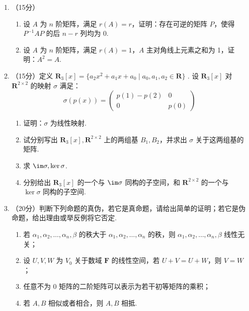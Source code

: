 \begin{enumerate}
    \item （15分）
    \begin{enumerate}
        \item 设 $A$ 为 $n$ 阶矩阵，满足 $r(A)=r$，证明：存在可逆的矩阵 $P$，使得 $P^{-1}AP$ 的后 $n-r$ 列均为 0.
        \item 设 $A$ 为 $n$ 阶矩阵，满足 $r(A)=1$，$A$ 主对角线上元素之和为 1，证明：$A^2=A$.
    \end{enumerate}

    \item （15分）定义 $\mathbf R_3[x]=\{a_2x^2+a_1x+a_0\mid a_0,a_1,a_2\in \mathbf R\}$ . 设 $\mathbf R_3[x]$ 对 $\mathbf R^{2\times 2}$ 的映射 $\sigma$ 满足：
    \[\sigma(p(x))=\begin{pmatrix}
    p(1)-p(2)&0\\
    0 & p(0)\end{pmatrix}\]

    \begin{enumerate}
        \item 证明：$\sigma$ 为线性映射.
        \item 试分别写出 $\mathbf R_3[x],\mathbf R^{2\times 2}$ 上的两组基 $B_1,B_2$，并求出 $\sigma$ 关于这两组基的矩阵.
        \item 求 $\im\sigma,\ker\sigma$.
        \item 分别给出 $\mathbf R_3[x]$ 的一个与 $\im\sigma$ 同构的子空间，和 $\mathbf R^{2\times 2}$ 的一个与 $\ker\sigma$ 同构的子空间.
    \end{enumerate}

    \item （20分）判断下列命题的真伪，若它是真命题，请给出简单的证明；若它是伪命题，给出理由或举反例将它否定.
    \begin{enumerate}
        \item 若 $\alpha_1,\alpha_2,\dots,\alpha_n,\beta$ 的秩大于 $\alpha_1,\alpha_2,\dots,\alpha_n$ 的秩，则 $\alpha_1,\alpha_2,\dots,\alpha_n,\beta$ 线性无关；
        \item 设 $U,V,W$ 为 $V_0$ 关于数域 $\mathbf{F}$ 的线性空间，若 $U+V=U+W$，则 $V=W$；
        \item 任意不为 0 矩阵的二阶矩阵可以表示为若干初等矩阵的乘积；
        \item 若 $A,B$ 相似或者相合，则 $A,B$ 相抵.
    \end{enumerate}
\end{enumerate}

\clearpage
